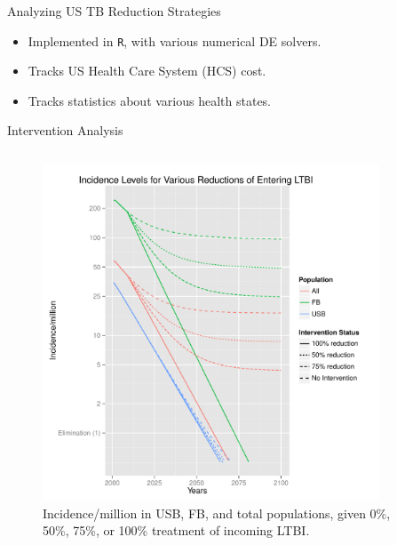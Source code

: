 \documentclass[final]{beamer}
\begin{document}
\begin{frame}
\begin{columns}
    \begin{column}{.3\textwidth}
      \vspace{-1.5em}
      \begin{block}{Analyzing US TB Reduction Strategies}
        \begin{itemize}
          \item Implemented in \texttt{R}, with various numerical DE solvers.
          \item Tracks US Health Care System (HCS) cost.
          \item Tracks statistics about various health states.
        \end{itemize}
        \begin{block}{Intervention Analysis}
          \vspace{-1.6em}
          \begin{column}{.45\textwidth}
            \begin{figure}[h]
              \begin{center}
                \includegraphics[height=10cm,width=\textwidth]{incidencePlotRedEnLTBI}
              \end{center}
              \caption{Incidence/million in USB, FB, and total populations,
                       given 0\%, 50\%, 75\%, or 100\% treatment of incoming
                       LTBI.}
              \label{fig:redEnLTBI_incidence}
            \end{figure}
          \end{column}
          \begin{column}{.45\textwidth}
            \begin{figure}[h]

\end{figure}
\end{column}
\end{block}
\end{block}
\end{column}
\end{columns}
\end{frame}
\end{document}
